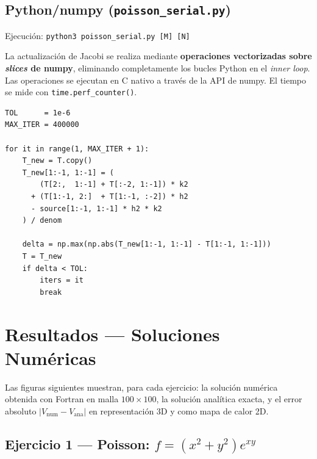 \documentclass[12pt, a4paper]{article}
\begin{document}
\subsection{Python/numpy (\texttt{poisson\_serial.py})}

Ejecución: \texttt{python3 poisson\_serial.py [M] [N]}

La actualización de Jacobi se realiza mediante \textbf{operaciones vectorizadas
sobre \emph{slices} de numpy}, eliminando completamente los bucles Python en el
\emph{inner loop}. Las operaciones se ejecutan en C nativo a través de la API
de numpy. El tiempo se mide con \texttt{time.perf\_counter()}.

\begin{lstlisting}[style=pythonstyle, caption={Núcleo de Jacobi en Python/numpy.}]
TOL      = 1e-6
MAX_ITER = 400000

for it in range(1, MAX_ITER + 1):
    T_new = T.copy()
    T_new[1:-1, 1:-1] = (
        (T[2:,  1:-1] + T[:-2, 1:-1]) * k2
      + (T[1:-1, 2:]  + T[1:-1, :-2]) * h2
      - source[1:-1, 1:-1] * h2 * k2
    ) / denom

    delta = np.max(np.abs(T_new[1:-1, 1:-1] - T[1:-1, 1:-1]))
    T = T_new
    if delta < TOL:
        iters = it
        break
\end{lstlisting}

\section{Resultados — Soluciones Numéricas}

Las figuras siguientes muestran, para cada ejercicio: la solución numérica
obtenida con Fortran en malla $100\times100$, la solución analítica exacta, y
el error absoluto $|V_\text{num} - V_\text{ana}|$ en representación 3D y como
mapa de calor 2D.

\subsection{Ejercicio 1 — Poisson: $f=(x^2+y^2)e^{xy}$}
\end{document}
